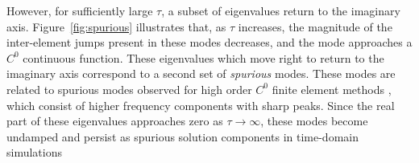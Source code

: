 \documentclass[10pt]{article}
\begin{document}
However, for sufficiently large $\tau$, a subset of eigenvalues return to the imaginary axis.  Figure~\ref{fig:spurious} illustrates that, as $\tau$ increases, the magnitude of the inter-element jumps present in these modes decreases, and the mode approaches a $C^0$ continuous function.  These eigenvalues which move right to return to the imaginary axis correspond to a second set of \emph{spurious} modes.  These modes are related to spurious modes observed for high order $C^0$ finite element methods \cite{ainsworth2014dispersive}, which consist of higher frequency components with sharp peaks.  Since the real part of these eigenvalues approaches zero as $\tau\rightarrow \infty$, these modes become undamped and persist as spurious solution components in time-domain simulations \cite{hughes2014finite}

\begin{figure}
\centering
{}
\hspace{.5em}
\hspace{.5em}
\\

\end{figure}
\end{document}
